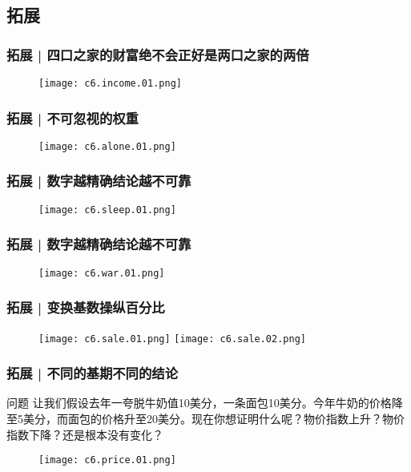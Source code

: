 \subsection{拓展}
\begin{frame}
  \frametitle{拓展 | 四口之家的财富绝不会正好是两口之家的两倍}
  \begin{figure}
    \centering
    \texttt{[image: c6.income.01.png]}
  \end{figure}
\end{frame}

\begin{frame}
  \frametitle{拓展 | 不可忽视的权重}
  \begin{figure}
    \centering
    \texttt{[image: c6.alone.01.png]}
  \end{figure}
\end{frame}

\begin{frame}
  \frametitle{拓展 | 数字越精确结论越不可靠}
  \begin{figure}
    \centering
    \texttt{[image: c6.sleep.01.png]}
  \end{figure}
\end{frame}

\begin{frame}
  \frametitle{拓展 | 数字越精确结论越不可靠}
  \begin{figure}
    \centering
    \texttt{[image: c6.war.01.png]}
  \end{figure}
\end{frame}

\begin{frame}
  \frametitle{拓展 | 变换基数操纵百分比}
  \begin{figure}
    \centering
    \texttt{[image: c6.sale.01.png]}\quad
    \texttt{[image: c6.sale.02.png]}
  \end{figure}
\end{frame}

\begin{frame}
  \frametitle{拓展 | 不同的基期不同的结论}
  \begin{block}{问题}
让我们假设去年一夸脱牛奶值10美分，一条面包10美分。今年牛奶的价格降至5美分，而面包的价格升至20美分。现在你想证明什么呢？物价指数上升？物价指数下降？还是根本没有变化？
  \end{block}
  \begin{figure}
    \centering
    \texttt{[image: c6.price.01.png]}
  \end{figure}
\end{frame}

